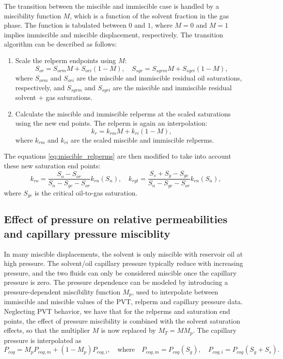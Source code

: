 \documentclass[11pt, a4paper]{article}
\begin{document}
The transition between the miscible and immiscible case is handled by a
miscibility function $M$, which is a function of the solvent fraction in the gas
phase. The function is tabulated between $0$ and $1$, where $M = 0$ and $M = 1$
implies immiscible and miscible displacement, respectively. The transition
algorithm can be described as follows:
\begin{enumerate}[label=\emph{(\roman*)}]
\item Scale the relperm endpoints using $M$:
  \begin{equation*}
    S_{or} = S_{orm}M + S_{ori}(1-M), \quad S_{sgr} = S_{sgrm}M + S_{sgri}(1-M),
  \end{equation*}
  where $S_{orm}$ and $S_{ori}$ are the miscible and immiscible residual oil saturations,
  respectively, and $S_{sgrm}$ and $S_{sgri}$ are the miscible and immiscible residual solvent + gas
  saturations.
\item Calculate the miscible and immiscible relperms at the scaled saturations using the new end
  points. The relperm is again an interpolation:
  \begin{equation*}
    k_r = k_{rm}M + k_{ri}(1-M),
  \end{equation*}
  where $k_{rm}$ and $k_{ri}$ are the scaled miscible and immiscible relperms.
\end{enumerate}
The equations \eqref{eq:miscible_relperms} are then modified to take into account these new
saturation end points:
\begin{equation*}
  k_{ro} = \frac{S_o - S_{or}}{S_n - S_{gc} - S_{or}}k_{rn}(S_n), \quad k_{rgt} = \frac{S_s + S_g - S_{gc}}{S_n - S_{gc} - S_{or}}k_{rn}(S_n),
\end{equation*}
where $S_{gc}$ is the critical oil-to-gas saturation.

\subsection*{Effect of pressure on relative permeabilities and capillary pressure misciblity}

In many miscible displacements, the solvent is only miscible with reservoir oil
at high pressure. The solvent/oil capillary pressure typically reduce with
increasing pressure, and the two fluids can only be considered miscible once the
capillary pressure is zero. The pressure dependence can be modeled by
introducing a pressure-dependent miscibility function $M_p$, used to interpolate
between immiscible and miscible values of the PVT, relperm and capillary
pressure data. Neglecting PVT behavior, we have that for the relperms and
saturation end points, the effect of pressure miscibility is combined with the
solvent saturation effects, so that the multiplier $M$ is now replaced by
$M_T = MM_p$. The capillary pressure is interpolated as
\begin{equation*}
  P_{cog} = M_p P_{cog,m} + (1-M_p)P_{cog,i}, \quad \text{where} \quad P_{cog,m} = P_{cog}(S_g), \quad P_{cog,i} = P_{cog}(S_g + S_s).
\end{equation*}
\end{document}
